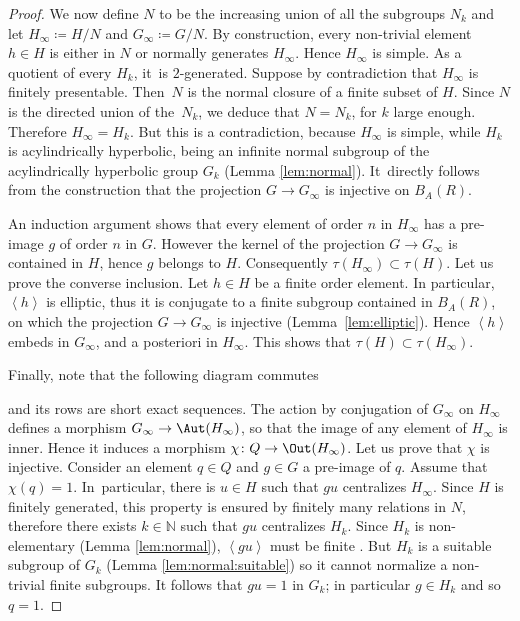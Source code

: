 \begin{proof}
We now define $N$ to be the increasing union of all the subgroups $N_k$ and let $H_\infty \coloneqq H/N$ and $G_\infty \coloneqq G/N$.
By construction, every non-trivial element $h \in H$ is either in $N$ or normally generates $H_\infty$.
Hence $H_\infty$ is simple.
As a quotient of every $H_k$, it~is $2$-generated.
Suppose by contradiction that $H_\infty$ is finitely presentable.
Then~$N$ is the normal closure of a finite subset of $H$.
Since $N$ is the directed union of the~$N_k$, we deduce that $N = N_k$, for $k$ large enough.
Therefore $H_\infty = H_k$.
But this is a contradiction, because $H_\infty$ is simple, while $H_k$ is acylindrically hyperbolic, being an infinite normal subgroup of the acylindrically hyperbolic group $G_k$ (Lemma \ref{lem:normal}).
It~directly follows from the construction that the projection $G \to G_\infty$ is injective on $B_A(R)$.

An induction argument shows that every element of order $n$ in $H_\infty$ has a pre-image $g$ of order $n$ in $G$.
However the kernel of the projection $G \to G_\infty$ is contained in $H$, hence $g$ belongs to $H$.
Consequently $\tau(H_\infty) \subset \tau(H)$.
Let us prove the converse inclusion.
Let $h \in H$ be a finite order element.
In particular, $\left<h \right>$ is elliptic, thus it is conjugate to a finite subgroup contained in $B_A(R)$, on which the projection $G \to G_\infty$ is injective (Lemma~\ref{lem:elliptic}).
Hence $\left< h \right>$ embeds in $G_\infty$, and a posteriori in $H_\infty$. This shows that $\tau(H) \subset \tau(H_\infty)$.

Finally, note that the following diagram commutes
\begin{center}
\end{center}
and its rows are short exact sequences.
The action by conjugation of $G_\infty$ on $H_\infty$ defines a morphism $G_\infty \to \Aut(H_\infty)$, so that the image of any element of $H_\infty$ is inner.
Hence it induces a morphism $\chi \colon Q \to \Out(H_\infty)$.
Let us prove that $\chi$ is injective.
Consider an element $q \in Q$ and $g \in G$ a pre-image of $q$.
Assume that $\chi(q) = 1$.
In~particular, there is $u \in H$ such that $gu$ centralizes $H_\infty$.
Since $H$ is finitely generated, this property is ensured by finitely many relations in $N$, therefore there exists $k \in \mathbb N$ such that $gu$ centralizes $H_k$.
Since $H_k$ is non-elementary (Lemma \ref{lem:normal}), $\left<gu\right>$ must be finite \cite[Prop.\,6]{WPD}. But $H_k$ is a suitable subgroup of $G_k$ (Lemma \ref{lem:normal:suitable}) so it cannot normalize a non-trivial finite subgroups. It follows that $gu = 1$ in $G_k$; in particular $g \in H_k$ and so $q = 1$.
\end{proof}

